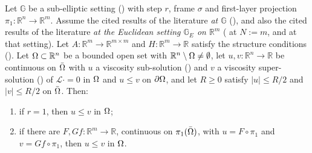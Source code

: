 \begin{theorem}
Let $\mathbb G$ be a sub-elliptic setting () with step $r$, frame
$\sigma$ and first-layer projection $\pi_1:\mathbb R^{n}\to\mathbb R^{m}$. Assume the cited
results of the literature \emph{at $\mathbb G$} (), and also the cited
results of the literature \emph{at the Euclidean setting $\mathbb G_E$ on $\mathbb R^{m}$}
( at $N:=m$, and  at that setting). Let
$A:\mathbb R^{m}\to\mathbb R^{m\times m}$ and $H:\mathbb R^{m}\to\mathbb R$ satisfy the
structure conditions (). Let $\Omega\subset\mathbb R^{n}$ be a
bounded open set with $\mathbb R^{n}\setminus\Omega\ne\emptyset$, let $u,v:\mathbb R^{n}\to\mathbb R$
be continuous on $\bar{\Omega}$ with $u$ a viscosity sub-solution () and
$v$ a viscosity super-solution () of $\mathcal L\cdot=0$ in $\Omega$ and
$u\le v$ on $\partial\Omega$, and let $R\ge0$ satisfy $|u|\le R/2$ and $|v|\le R/2$ on $\bar{\Omega}$.
Then:
\begin{enumerate}
\item if $r=1$, then $u\le v$ in $\Omega$;
\item if there are $F,Gf:\mathbb R^{m}\to\mathbb R$, continuous on $\pi_1(\bar{\Omega})$, with
  $u=F\circ\pi_1$ and $v=Gf\circ\pi_1$, then $u\le v$ in $\Omega$.
\end{enumerate}
\end{theorem}
